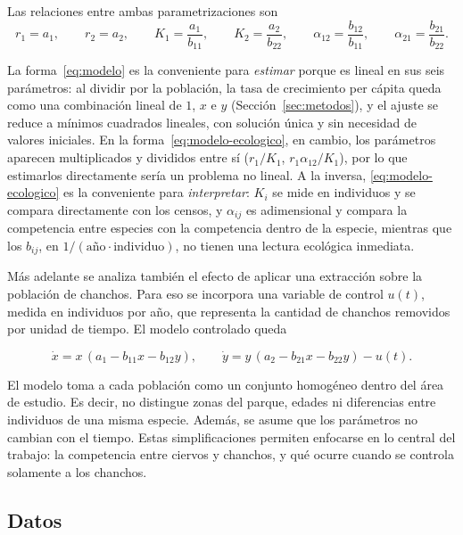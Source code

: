 \documentclass[11pt,a4paper]{article}
\newif\ifguias
\newcommand{\guia}[1]{\ifguias\par\noindent
  {\color{gray!85!black}\small\itshape #1}\par\medskip\fi}
\begin{document}
Las relaciones entre ambas parametrizaciones son
\begin{equation}
\label{eq:relaciones-parametros}
r_1 = a_1, \qquad r_2 = a_2, \qquad
K_1 = \frac{a_1}{b_{11}}, \qquad K_2 = \frac{a_2}{b_{22}}, \qquad
\alpha_{12} = \frac{b_{12}}{b_{11}}, \qquad
\alpha_{21} = \frac{b_{21}}{b_{22}}.
\end{equation}

La forma~\eqref{eq:modelo} es la conveniente para \emph{estimar} porque es
lineal en sus seis parámetros: al dividir por la población, la tasa de
crecimiento per cápita queda como una combinación lineal de $1$, $x$ e $y$
(Sección~\ref{sec:metodos}), y el ajuste se reduce a mínimos cuadrados
lineales, con solución única y sin necesidad de valores iniciales. En la
forma~\eqref{eq:modelo-ecologico}, en cambio, los parámetros aparecen
multiplicados y divididos entre sí ($r_1/K_1$, $r_1\alpha_{12}/K_1$), por lo
que estimarlos directamente sería un problema no lineal. A la inversa,
\eqref{eq:modelo-ecologico} es la conveniente para \emph{interpretar}: $K_i$
se mide en individuos y se compara directamente con los censos, y
$\alpha_{ij}$ es adimensional y compara la competencia entre especies con la
competencia dentro de la especie, mientras que los $b_{ij}$, en
$1/(\text{año}\cdot\text{individuo})$, no tienen una lectura ecológica
inmediata.

Más adelante se analiza también el efecto de aplicar una extracción sobre la población de chanchos. Para eso se incorpora una variable de control $u(t)$, medida en individuos por año, que representa la cantidad de chanchos removidos por unidad de tiempo. El modelo controlado queda

\begin{equation}
\label{eq:modelo-control}
\dot x = x\,(a_1 - b_{11}x - b_{12}y), \qquad
\dot y = y\,(a_2 - b_{21}x - b_{22}y) - u(t).
\end{equation}

El modelo toma a cada población como un conjunto homogéneo dentro del área de estudio. Es decir, no distingue zonas del parque, edades ni diferencias entre individuos de una misma especie. Además, se asume que los parámetros no cambian con el tiempo. Estas simplificaciones permiten enfocarse en lo central del trabajo: la competencia entre ciervos y chanchos, y qué ocurre cuando se controla solamente a los chanchos.

\subsection{Datos}
\end{document}
